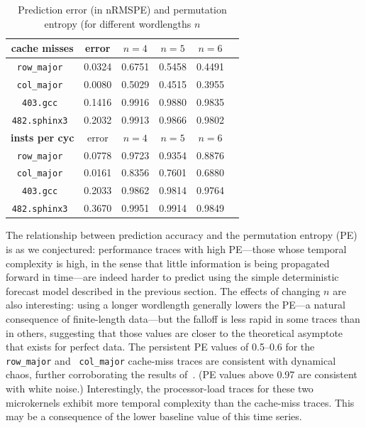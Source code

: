 \documentclass{article}
\begin{document}
  \begin{table}[htbp]
   \caption{Prediction error (in nRMSPE) and permutation entropy (for
     different wordlengths $n$}
   \label{tab:pe}
   \centering
   \begin{tabular}{|c|c|c|c|c|c|}
     \hline
      {\bf cache misses} & error   &$n=4$&$n=5$&$n=6$\\
     \hline
     \tt{row\_major}  & 0.0324  &0.6751&0.5458&0.4491\\
     \hline
     \tt{col\_major}  & 0.0080  &0.5029&0.4515&0.3955 \\
     \hline
     \tt{403.gcc}  & 0.1416  &0.9916&0.9880&0.9835\\
     \hline
     \tt{482.sphinx3}  & 0.2032  &0.9913&0.9866&0.9802 \\
      \hline
      \hline
      {\bf insts per cyc} & error   &$n=4$&$n=5$&$n=6$\\
     \hline
      \tt{row\_major} & 0.0778  &0.9723&0.9354&0.8876\\
     \hline
      \tt{col\_major} & 0.0161   &0.8356&0.7601&0.6880\\
     \hline
     \tt{403.gcc} & 0.2033   &0.9862&0.9814&0.9764\\
     \hline
     \tt{482.sphinx3} & 0.3670 & 0.9951&0.9914&0.9849 \\
      \hline
   \end{tabular}
 \end{table}
The relationship between prediction accuracy and the permutation
entropy (PE) is as we conjectured: performance traces with high
PE---those whose temporal complexity is high, in the sense that little
information is being propagated forward in time---are indeed harder to
predict using the simple deterministic forecast model described in the
previous section.  The effects of changing $n$ are also interesting:
using a longer wordlength generally lowers the PE---a natural
consequence of finite-length data---but the falloff is less rapid in
some traces than in others, suggesting that those values are closer to
the theoretical asymptote that exists for perfect data.  The
persistent PE values of 0.5--0.6 for the {\tt row\_major} and {\tt
  col\_major} cache-miss traces are consistent with dynamical chaos,
further corroborating the results of~\cite{mytkowicz09}.  (PE values
above 0.97 are consistent with white noise.)  Interestingly, the
processor-load traces for these two microkernels exhibit more temporal
complexity than the cache-miss traces.  This may be a consequence of
the lower baseline value of this time series.
\end{document}

